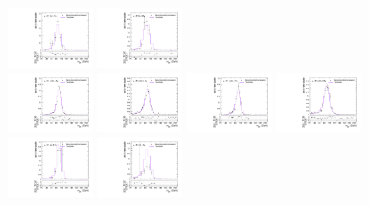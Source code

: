 \begin{figure}[htpb]
  \includegraphics[width=0.2\textwidth]{fig/analysisAppendix/templateVsReco_WprToWZ2000_r0_MJ_mu_HP_bb_HDy.pdf}
  \includegraphics[width=0.2\textwidth]{fig/analysisAppendix/templateVsReco_WprToWZ2000_r0_MJ_mu_LP_bb_HDy.pdf}\\
  \includegraphics[width=0.2\textwidth]{fig/analysisAppendix/templateVsReco_WprToWZ2000_r0_MJ_mu_HP_nobb_LDy.pdf}
  \includegraphics[width=0.2\textwidth]{fig/analysisAppendix/templateVsReco_WprToWZ2000_r0_MJ_mu_LP_nobb_LDy.pdf}
  \includegraphics[width=0.2\textwidth]{fig/analysisAppendix/templateVsReco_WprToWZ2000_r0_MJ_mu_HP_nobb_HDy.pdf}
  \includegraphics[width=0.2\textwidth]{fig/analysisAppendix/templateVsReco_WprToWZ2000_r0_MJ_mu_LP_nobb_HDy.pdf}\\
  \includegraphics[width=0.2\textwidth]{fig/analysisAppendix/templateVsReco_WprToWZ2000_r0_MJ_mu_HP_vbf_LDy.pdf}
  \includegraphics[width=0.2\textwidth]{fig/analysisAppendix/templateVsReco_WprToWZ2000_r0_MJ_mu_LP_vbf_LDy.pdf}

\end{figure}
